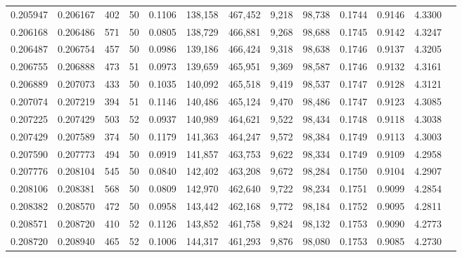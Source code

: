\begin{tabular}{rrrrrrrrrrrrr}
0.205947 & 0.206167 &   402 &  50 &                                     0.1106 & 138,158 & 467,452 &   9,218 &  98,738 & 0.1744 & 0.9146 & 4.3300 \\
0.206168 & 0.206486 &   571 &  50 &                                     0.0805 & 138,729 & 466,881 &   9,268 &  98,688 & 0.1745 & 0.9142 & 4.3247 \\
0.206487 & 0.206754 &   457 &  50 &                                     0.0986 & 139,186 & 466,424 &   9,318 &  98,638 & 0.1746 & 0.9137 & 4.3205 \\
0.206755 & 0.206888 &   473 &  51 &                                     0.0973 & 139,659 & 465,951 &   9,369 &  98,587 & 0.1746 & 0.9132 & 4.3161 \\
0.206889 & 0.207073 &   433 &  50 &                                     0.1035 & 140,092 & 465,518 &   9,419 &  98,537 & 0.1747 & 0.9128 & 4.3121 \\
0.207074 & 0.207219 &   394 &  51 &                                     0.1146 & 140,486 & 465,124 &   9,470 &  98,486 & 0.1747 & 0.9123 & 4.3085 \\
0.207225 & 0.207429 &   503 &  52 &                                     0.0937 & 140,989 & 464,621 &   9,522 &  98,434 & 0.1748 & 0.9118 & 4.3038 \\
0.207429 & 0.207589 &   374 &  50 &                                     0.1179 & 141,363 & 464,247 &   9,572 &  98,384 & 0.1749 & 0.9113 & 4.3003 \\
0.207590 & 0.207773 &   494 &  50 &                                     0.0919 & 141,857 & 463,753 &   9,622 &  98,334 & 0.1749 & 0.9109 & 4.2958 \\
0.207776 & 0.208104 &   545 &  50 &                                     0.0840 & 142,402 & 463,208 &   9,672 &  98,284 & 0.1750 & 0.9104 & 4.2907 \\
0.208106 & 0.208381 &   568 &  50 &                                     0.0809 & 142,970 & 462,640 &   9,722 &  98,234 & 0.1751 & 0.9099 & 4.2854 \\
0.208382 & 0.208570 &   472 &  50 &                                     0.0958 & 143,442 & 462,168 &   9,772 &  98,184 & 0.1752 & 0.9095 & 4.2811 \\
0.208571 & 0.208720 &   410 &  52 &                                     0.1126 & 143,852 & 461,758 &   9,824 &  98,132 & 0.1753 & 0.9090 & 4.2773 \\
0.208720 & 0.208940 &   465 &  52 &                                     0.1006 & 144,317 & 461,293 &   9,876 &  98,080 & 0.1753 & 0.9085 & 4.2730 \\

\end{tabular}
